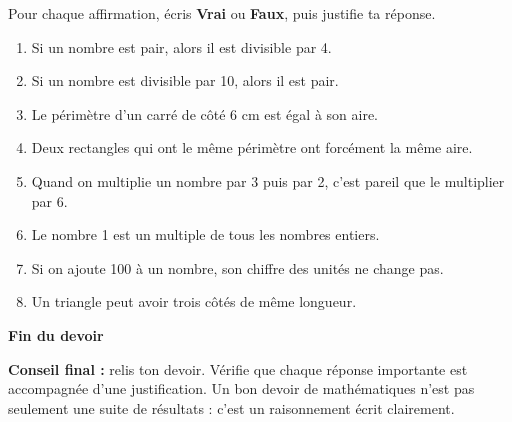 \documentclass[11pt,a4paper]{article}
\begin{document}
Pour chaque affirmation, écris \textbf{Vrai} ou \textbf{Faux}, puis justifie ta réponse.

\begin{enumerate}[label=\textbf{\arabic*)}]
    \item Si un nombre est pair, alors il est divisible par 4.
    
    \item Si un nombre est divisible par 10, alors il est pair.
    
    \item Le périmètre d'un carré de côté 6 cm est égal à son aire.
    
    \item Deux rectangles qui ont le même périmètre ont forcément la même aire.
    
    \item Quand on multiplie un nombre par 3 puis par 2, c'est pareil que le multiplier par 6.
    
    \item Le nombre 1 est un multiple de tous les nombres entiers.
    
    \item Si on ajoute 100 à un nombre, son chiffre des unités ne change pas.
    
    \item Un triangle peut avoir trois côtés de même longueur.
\end{enumerate}

\vspace{5mm}

\begin{center}
\Large \textbf{\textcolor{bleu}{Fin du devoir}}
\end{center}

\vspace{3mm}

\begin{consigne}
\textbf{Conseil final :} relis ton devoir. Vérifie que chaque réponse importante est accompagnée d'une justification.
Un bon devoir de mathématiques n'est pas seulement une suite de résultats : c'est un raisonnement écrit clairement.
\end{consigne}
\end{document}
